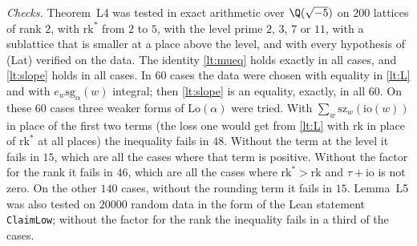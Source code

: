 \documentclass[11pt,letterpaper]{article}
\begin{document}
\emph{Checks.} Theorem~L4 was tested in exact arithmetic over $\Q(\sqrt{-5})$ on $200$ lattices of rank
$2$, with $\mathrm{rk}^*$ from $2$ to $5$, with the level prime $2$, $3$, $7$ or $11$, with a sublattice
that is smaller at a place above the level, and with every hypothesis of \textup{(Lat)} verified on the
data. The identity \eqref{lt:mueq} holds exactly in all cases, and \eqref{lt:slope} holds in all cases. In
$60$ cases the data were chosen with equality in \eqref{lt:L} and with $e_w\mathrm{sg}_\alpha(w)$ integral;
then \eqref{lt:slope} is an equality, exactly, in all $60$. On these $60$ cases three weaker forms of
$\mathrm{Lo}(\alpha)$ were tried. With $\sum_w\mathrm{sz}_w(\mathrm{io}(w))$ in place of the first two
terms (the loss one would get from \eqref{lt:L} with $\mathrm{rk}$ in place of $\mathrm{rk}^*$ at all
places) the inequality fails in $48$. Without the term at the level it fails in $15$, which are all the
cases where that term is positive. Without the factor for the rank it fails in $46$, which are all the
cases where $\mathrm{rk}^*>\mathrm{rk}$ and $\tau+\mathrm{io}$ is not zero. On the other $140$ cases,
without the rounding term it fails in $15$. Lemma~L5 was also tested on $20000$ random data in the form of
the Lean statement \texttt{ClaimLow}; without the factor for the rank the inequality fails in a third of
the cases.
\end{document}
